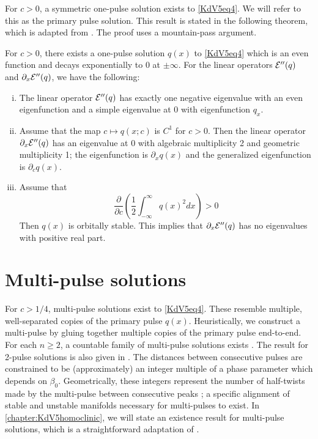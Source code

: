 \documentclass[thesis.tex]{subfiles}
\begin{document}
For $c > 0$, a symmetric one-pulse solution exists to \cref{KdV5eq4}. We will refer to this as the primary pulse solution. This result is stated in the following theorem, which is adapted from \cite[Theorem 2.1]{Pelinovsky2007}. The proof uses a mountain-pass argument.

\begin{theorem}\label{KdV1pulse}
For $c > 0$, there exists a one-pulse solution $q(x)$ to \cref{KdV5eq4} which is an even function and decays exponentially to 0 at $\pm \infty$. For the linear operators $\mathcal{E}''(q)$ and $\partial_x \mathcal{E}''(q)$, we have the following:
\begin{enumerate}[(i)]
\item The linear operator $\mathcal{E}''(q)$ has exactly one negative eigenvalue with an even eigenfunction and a simple eigenvalue at 0 with eigenfunction $q_x$.
\item Assume that the map $c \mapsto q(x; c)$ is $C^1$ for $c > 0$. Then the linear operator $\partial_x \mathcal{E}''(q)$ has an eigenvalue at 0 with algebraic multiplicity 2 and geometric multiplicity 1; the eigenfunction is $\partial_x q(x)$ and the generalized eigenfunction is $\partial_c q(x)$. 
\item Assume that 
\[
\frac{\partial}{\partial c} \left( \frac{1}{2} \int_{-\infty}^\infty q(x)^2 dx \right) > 0
\]
Then $q(x)$ is orbitally stable. This implies that $\partial_x \mathcal{E}''(q)$ has no eigenvalues with positive real part.
\end{enumerate}
\end{theorem}

\section{Multi-pulse solutions}

For $c > 1/4$, multi-pulse solutions exist to \cref{KdV5eq4}. These resemble multiple, well-separated copies of the primary pulse $q(x)$. Heuristically, we construct a multi-pulse by gluing together multiple copies of the primary pulse end-to-end. For each $n \geq 2$, a countable family of multi-pulse solutions exists \cite{Buffoni1996}. The result for 2-pulse solutions is also given in \cite[Theorem 2.2]{Pelinovsky2007}. The distances between consecutive pulses are constrained to be (approximately) an integer multiple of a phase parameter which depends on $\beta_0$. Geometrically, these integers represent the number of half-twists made by the multi-pulse between consecutive peaks \cite{SandstedeStrut}; a specific alignment of stable and unstable manifolds necessary for multi-pulses to exist. In \cref{chapter:KdV5homoclinic}, we will state an existence result for multi-pulse solutions, which is a straightforward adaptation of \cite[Theorem 3.6]{SandstedeStrut}. 
\end{document}
